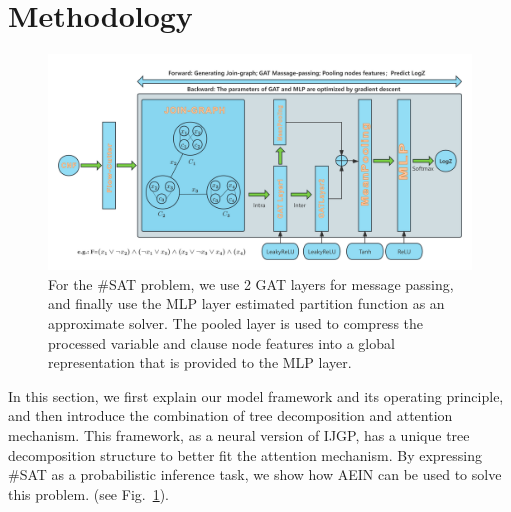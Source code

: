 \section{Methodology}
\begin{figure}[h]
\centering 
\includegraphics[width=1\textwidth]{png/AEIN2.png}
\caption{For the \#SAT problem, we use 2 GAT layers for message passing, and finally use the MLP layer estimated partition function as an approximate solver. The pooled layer is used to compress the processed variable and clause node features into a global representation that is provided to the MLP layer.} \label{fig1}
\end{figure}
In this section, we first explain our model framework and its operating principle, and then introduce the combination of tree decomposition and attention mechanism. This framework, as a neural version of IJGP, has a unique tree decomposition structure to better fit the attention mechanism. By expressing \#SAT as a probabilistic inference task, we show how AEIN can be used to solve this problem. (see Fig.~\ref{fig1}).
